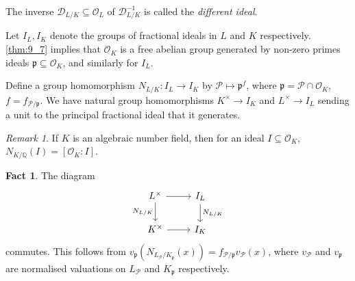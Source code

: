 \documentclass[11pt]{article}
\theoremstyle{definition}
\newtheorem*{fact}{Fact}
\theoremstyle{plain}
\theoremstyle{remark}
\newtheorem*{remark}{Remark}
\newcommand{\QQ}{\mathbb{Q}}
\newcommand{\cD}{\mathcal{D}}
\newcommand{\cO}{\mathcal{O}}
\newcommand{\cP}{\mathcal{P}}
\newcommand{\fp}{\mathfrak{p}}
\begin{document}
The inverse $\cD_{L/K} \subseteq \cO_L$ of $\cD_{L/K}^{-1}$ is called the \emph{different ideal}.

Let $I_L, I_K$ denote the groups of fractional ideals in $L$ and $K$ respectively. \autoref{thm:9_7} implies that $\cO_K$ is a free abelian group generated by non-zero primes ideals $\fp \subseteq \cO_K$, and similarly for $I_L$.

Define a group homomorphism $N_{L/K} : I_L \to I_K$ by $\cP \mapsto \fp^f$, where $\fp = \cP \cap \cO_K$, $f = f_{\cP / \fp}$. We have natural group homomorphisms $K^\times \to I_K$ and $L^\times \to I_L$ sending a unit to the principal fractional ideal that it generates.

\begin{remark}
    If $K$ is an algebraic number field, then for an ideal $I \subseteq \cO_K$, $N_{K / \QQ}(I) = [\cO_K : I]$.
\end{remark}

\begin{fact} The diagram
    \begin{equation*}
    \begin{tikzcd}
        L^\times \arrow[d, "N_{L/K}"'] \arrow[r] & I_L \arrow[d, "N_{L/K}"]\\
        K^\times \arrow[r] & I_K
    \end{tikzcd}
    \end{equation*}
    commutes. This follows from $v_\fp(N_{L_\cP/K_\fp}(x)) = f_{\cP / \fp} v_\cP(x)$, where $v_\cP$ and $v_\fp$ are normalised valuations on $L_\cP$ and $K_\fp$ respectively.
\end{fact}
\end{document}
